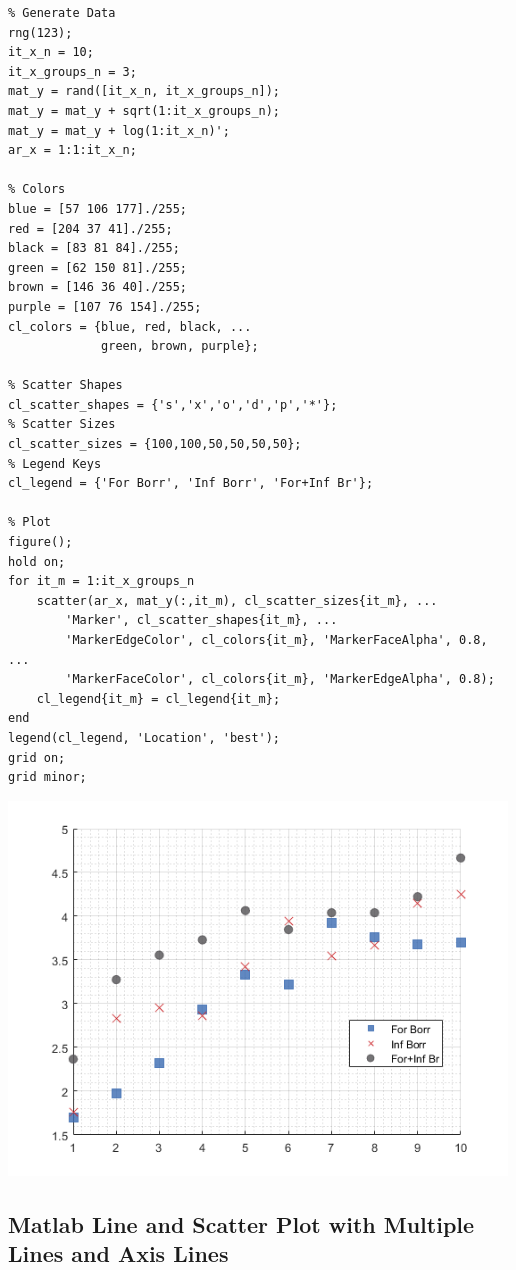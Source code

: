 \documentclass[
]{book}
\begin{document}
\begin{verbatim}
% Generate Data
rng(123);
it_x_n = 10;
it_x_groups_n = 3;
mat_y = rand([it_x_n, it_x_groups_n]);
mat_y = mat_y + sqrt(1:it_x_groups_n);
mat_y = mat_y + log(1:it_x_n)';
ar_x = 1:1:it_x_n;

% Colors
blue = [57 106 177]./255;
red = [204 37 41]./255;
black = [83 81 84]./255;
green = [62 150 81]./255;
brown = [146 36 40]./255;
purple = [107 76 154]./255;
cl_colors = {blue, red, black, ...
             green, brown, purple};

% Scatter Shapes
cl_scatter_shapes = {'s','x','o','d','p','*'};
% Scatter Sizes
cl_scatter_sizes = {100,100,50,50,50,50};
% Legend Keys
cl_legend = {'For Borr', 'Inf Borr', 'For+Inf Br'};

% Plot
figure();
hold on;
for it_m = 1:it_x_groups_n
    scatter(ar_x, mat_y(:,it_m), cl_scatter_sizes{it_m}, ...
        'Marker', cl_scatter_shapes{it_m}, ...
        'MarkerEdgeColor', cl_colors{it_m}, 'MarkerFaceAlpha', 0.8, ...
        'MarkerFaceColor', cl_colors{it_m}, 'MarkerEdgeAlpha', 0.8);
    cl_legend{it_m} = cl_legend{it_m};
end
legend(cl_legend, 'Location', 'best');
grid on; 
grid minor;
\end{verbatim}

\includegraphics[width=5.20833in,height=\textheight]{img/fs_scatter_images/figure_1.png}

\vspace{1em}

\hypertarget{matlab-line-and-scatter-plot-with-multiple-lines-and-axis-lines}{%
\subsection{Matlab Line and Scatter Plot with Multiple Lines and Axis Lines}\label{matlab-line-and-scatter-plot-with-multiple-lines-and-axis-lines}}
\end{document}
